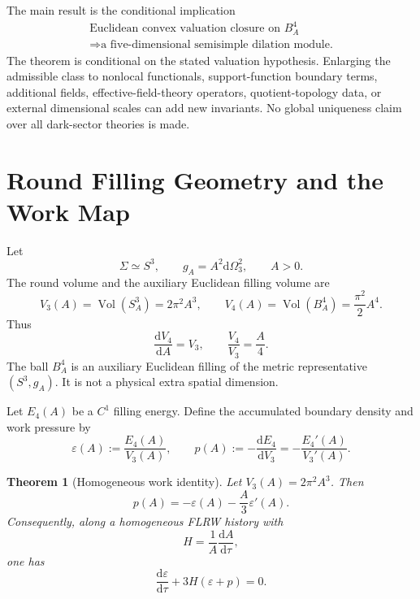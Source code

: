 \documentclass[aps,prd,preprint,onecolumn,nofootinbib,superscriptaddress,showkeys]{revtex4-2}
\numberwithin{equation}{section}
\theoremstyle{definition}
\theoremstyle{plain}
\newtheorem{theorem}{Theorem}[section]
\newcommand{\Sthree}{S^3}
\newcommand{\Bfour}{B^4}
\newcommand{\dd}{\mathrm d}
\newcommand{\vol}{\operatorname{Vol}}
\begin{document}
The main result is the conditional implication
\begin{equation}
\boxed{
\begin{gathered}
\text{Euclidean convex valuation closure on }\Bfour_A\\
\Longrightarrow
\text{a five-dimensional semisimple dilation module.}
\end{gathered}}
\end{equation}
The theorem is conditional on the stated valuation hypothesis.  Enlarging the admissible class to nonlocal functionals, support-function boundary terms, additional fields, effective-field-theory operators, quotient-topology data, or external dimensional scales can add new invariants.  No global uniqueness claim over all dark-sector theories is made.

\section{Round Filling Geometry and the Work Map}

Let
\begin{equation}
\Sigma\simeq \Sthree,
\qquad
g_A=A^2\dd\Omega_3^2,
\qquad
A>0.
\end{equation}
The round volume and the auxiliary Euclidean filling volume are
\begin{equation}
V_3(A)=\vol(\Sthree_A)=2\pi^2A^3,
\qquad
V_4(A)=\vol(\Bfour_A)=\frac{\pi^2}{2}A^4.
\end{equation}
Thus
\begin{equation}
\frac{\dd V_4}{\dd A}=V_3,
\qquad
\frac{V_4}{V_3}=\frac A4.
\end{equation}
The ball \(\Bfour_A\) is an auxiliary Euclidean filling of the metric representative \((\Sthree,g_A)\).  It is not a physical extra spatial dimension.

Let \(E_4(A)\) be a \(C^1\) filling energy.  Define the accumulated boundary density and work pressure by
\begin{equation}
\varepsilon(A):=\frac{E_4(A)}{V_3(A)},
\qquad
p(A):=-\frac{\dd E_4}{\dd V_3}
=-\frac{E_4'(A)}{V_3'(A)}.
\end{equation}

\begin{theorem}[Homogeneous work identity]
Let \(V_3(A)=2\pi^2A^3\).  Then
\begin{equation}
p(A)=-\varepsilon(A)-\frac A3\varepsilon'(A).
\end{equation}
Consequently, along a homogeneous FLRW history with
\[
H=\frac1A\frac{\dd A}{\dd\tau},
\]
one has
\begin{equation}
\frac{\dd\varepsilon}{\dd\tau}+3H(\varepsilon+p)=0.
\end{equation}
\end{theorem}
\end{document}

